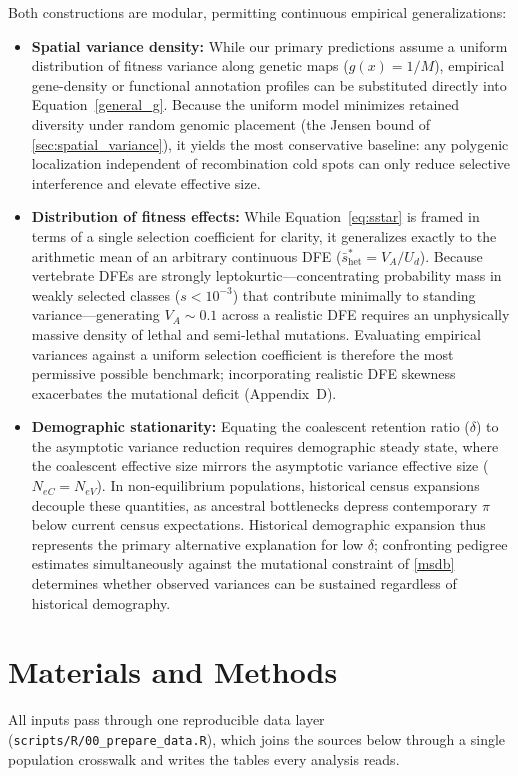\documentclass[12pt]{article}
\begin{document}
Both constructions are modular, permitting continuous empirical generalizations:
\begin{itemize}
    \item \textbf{Spatial variance density:} While our primary predictions assume a uniform distribution of fitness variance along genetic maps ($g(x) = 1/M$), empirical gene-density or functional annotation profiles can be substituted directly into Equation~\eqref{general_g}. Because the uniform model minimizes retained diversity under random genomic placement (the Jensen bound of \autoref{sec:spatial_variance}), it yields the most conservative baseline: any polygenic localization independent of recombination cold spots can only reduce selective interference and elevate effective size.
    \item \textbf{Distribution of fitness effects:} While Equation~\eqref{eq:sstar} is framed in terms of a single selection coefficient for clarity, it generalizes exactly to the arithmetic mean of an arbitrary continuous DFE ($\bar{s}_\text{het}^* = V_A / U_d$). Because vertebrate DFEs are strongly leptokurtic—concentrating probability mass in weakly selected classes ($s < 10^{-3}$) that contribute minimally to standing variance—generating $V_A \sim 0.1$ across a realistic DFE requires an unphysically massive density of lethal and semi-lethal mutations. Evaluating empirical variances against a uniform selection coefficient is therefore the most permissive possible benchmark; incorporating realistic DFE skewness exacerbates the mutational deficit (Appendix~D).
    \item \textbf{Demographic stationarity:} Equating the coalescent retention ratio ($\delta$) to the asymptotic variance reduction requires demographic steady state, where the coalescent effective size mirrors the asymptotic variance effective size ($N_{eC} = N_{eV}$). In non-equilibrium populations, historical census expansions decouple these quantities, as ancestral bottlenecks depress contemporary $\pi$ below current census expectations. Historical demographic expansion thus represents the primary alternative explanation for low $\delta$; confronting pedigree estimates simultaneously against the mutational constraint of \autoref{msdb} determines whether observed variances can be sustained regardless of historical demography.
\end{itemize}

\section{Materials and Methods}
All inputs pass through one reproducible data layer (\texttt{scripts/R/00\_prepare\_data.R}), which joins the sources below through a single population crosswalk and writes the tables every analysis reads.
\end{document}
